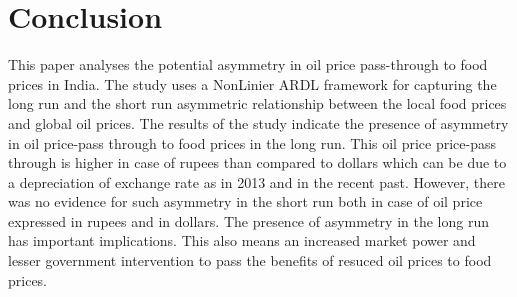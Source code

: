 \documentclass[a4paper,12pt]{article}
\begin{document}
\section{Conclusion}
This paper analyses the potential asymmetry in oil price pass-through to food prices in India. The study uses a NonLinier ARDL framework for capturing the long run and the short run asymmetric relationship between the local food prices and global oil prices. The results of the study indicate the presence of asymmetry in oil price-pass through to food prices in the long run. This oil price price-pass through is higher in case of rupees than compared to dollars which can be due to a depreciation of exchange rate as in 2013 and in the recent past. However, there was no evidence for such asymmetry in the short run both in case of oil price expressed in rupees and in dollars. The presence of asymmetry in the long run has important implications. This also means an increased market power and lesser government intervention to pass the benefits of resuced oil prices to food prices. 
\end{document}
